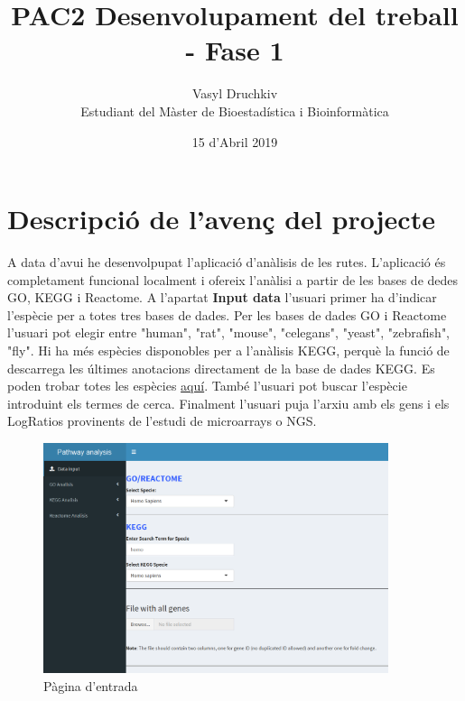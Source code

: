 \documentclass[]{article}
\title{PAC2 Desenvolupament del treball - Fase 1}
\date{15 d'Abril 2019}
\author{Vasyl Druchkiv \\ Estudiant del Màster de Bioestadística i Bioinformàtica}
\begin{document}
\maketitle
\makeatletter

\makeatother
\begin{spacing}{0.1}
\tableofcontents
\end{spacing}



\section{Descripció de l'avenç del projecte} 

A data d'avui he desenvolpupat l'aplicació d'anàlisis de les rutes. L'aplicació és completament funcional localment i ofereix l'anàlisi a partir de les bases de dedes GO, KEGG i Reactome. A l'apartat \textbf{Input data} l'usuari primer ha d'indicar l'espècie per a totes tres bases de dades. Per les bases de dades GO i Reactome l'usuari pot elegir entre "human", "rat", "mouse", "celegans", "yeast", "zebrafish", "fly". Hi ha més espècies disponobles per a l'anàlisis KEGG, perquè la funció de   descarrega les últimes anotacions directament de la base de dades KEGG. Es poden trobar totes les espècies \href{http://www.genome.jp/kegg/catalog/org_list.html}{aquí}. També l'usuari pot buscar l'espècie introduint els termes de cerca. Finalment l'usuari puja l'arxiu amb els gens i els LogRatios provinents de l'estudi de microarrays o NGS. 

\begin{figure}[h!]
\caption{Pàgina d'entrada}
\centering
\includegraphics[width=0.9\textwidth]{App_F1}
\end{figure}
\end{document}

